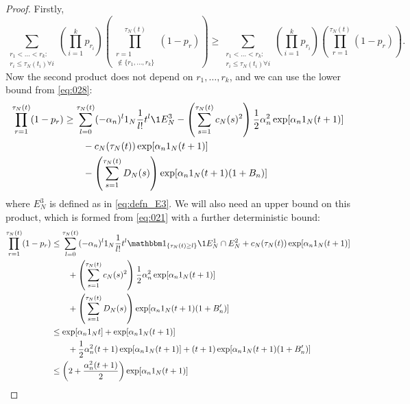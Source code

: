 \begin{proof}
Firstly,
\begin{equation}
\sum_{\substack{r_1 <\dots< r_k :\\ r_i \leq \tau_N(t_i) \forall i}}
        \left( \prod_{i=1}^k p_{r_i} \right)
        \left( \prod_{\substack{r=1 \\ \notin \{r_1,\dots,r_k\} }}^{\tau_N(t)} 
        (1-p_r) \right)
\geq \sum_{\substack{r_1 <\dots< r_k :\\ r_i \leq \tau_N(t_i) \forall i}}
        \left( \prod_{i=1}^k p_{r_i} \right)
        \left( \prod_{r=1}^{\tau_N(t)} 
        (1-p_r) \right) . \label{eq:032a}
\end{equation}
Now the second product does not depend on $r_1,\dots,r_k$, and we can use the lower bound from \eqref{eq:028}:
\begin{align}
\prod_{r=1}^{\tau_N(t)} (1-p_r)
&\geq \sum_{l=0}^{\tau_N(t)} (-\alpha_n)^l \ON 
        \frac{1}{l!} t^l \1{E_N^3}
        - \left( \sum_{s=1}^{\tau_N(t)} c_N(s)^2 \right)
        \frac{1}{2} \alpha_n^2 \exp[ \alpha_n \ON (t+1) ]\notag\\
    &\qquad- c_N(\tau_N(t)) \exp[ \alpha_n \ON (t+1) ] \notag\\
    &\qquad- \left( \sum_{s=1}^{\tau_N(t)} D_N(s) \right)
        \exp[ \alpha_n \ON (t+1) (1+B_n) ] \label{eq:033a}
\end{align}
where $E_N^3$ is defined as in \eqref{eq:defn_E3}.
We will also need an upper bound on this product, which is formed from \eqref{eq:021} with a further deterministic bound:
\begin{align}
\prod_{r=1}^{\tau_N(t)} (1-p_r)
&\leq \sum_{l=0}^{\tau_N(t)} (-\alpha_n)^l \ON \frac{1}{l!} t^l
        \I{\tau_N(t) \geq l} \1{E_N^1 \cap E_N^2}
        + c_N(\tau_N(t)) \exp[ \alpha_n \ON (t+1) ] \notag\\
    &\qquad+ \left( \sum_{s=1}^{\tau_N(t)} c_N(s)^2 \right)
        \frac{1}{2} \alpha_n^2 \exp[ \alpha_n \ON (t+1) ] \notag\\
    &\qquad+ \left( \sum_{s=1}^{\tau_N(t)} D_N(s) \right)
        \exp[ \alpha_n \ON (t+1) (1+B_n^\prime) ] \notag\\
&\leq \exp[ \alpha_n \ON t ]
        + \exp[ \alpha_n \ON (t+1) ]  \notag\\
    &\qquad+ \frac{1}{2} \alpha_n^2 (t+1)
        \exp[ \alpha_n \ON (t+1) ]
        + (t+1) \exp[ \alpha_n \ON (t+1) (1+B_n^\prime) ] \notag\\
&\leq \left( 2 + \frac{\alpha_n^2 (t+1)}{2} \right) 
        \exp[ \alpha_n \ON (t+1) ] 

\end{align}
\end{proof}
